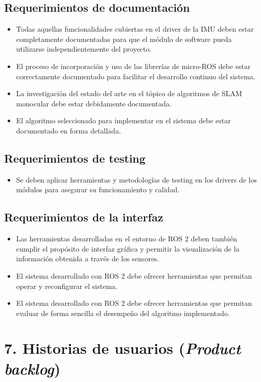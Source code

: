 \documentclass[
11pt, %
codirector, %
]{charter}
\begin{document}
\subsection{Requerimientos de documentación}
\begin{itemize}
	\item Todas aquellas funcionalidades cubiertas en el driver de la IMU deben estar completamente documentadas para que el módulo de software pueda utilizarse independientemente del proyecto.
	\item El proceso de incorporación y uso de las librerías de micro-ROS debe estar correctamente documentado para facilitar el desarrollo continuo del sistema.
	\item La investigación del estado del arte en el tópico de algoritmos de SLAM monocular debe estar debidamente documentada.
	\item El algoritmo seleccionado para implementar en el sistema debe estar documentado en forma detallada.
\end{itemize}

\subsection{Requerimientos de testing}
\begin{itemize}
	\item Se deben aplicar herramientas y metodologías de testing en los drivers de los módulos para asegurar su funcionamiento y calidad.
\end{itemize}

\subsection{Requerimientos de la interfaz}
\begin{itemize}
	\item Las herramientas desarrolladas en el entorno de ROS 2 deben también cumplir el propósito de interfaz gráfica y permitir la visualización de la información obtenida a través de los sensores.
	\item El sistema desarrollado con ROS 2 debe ofrecer herramientas que permitan operar y reconfigurar el sistema.
	\item El sistema desarrollado con ROS 2 debe ofrecer herramientas que permitan evaluar de forma sencilla el desempeño del algoritmo implementado.
\end{itemize}

\section{7. Historias de usuarios (\textit{Product backlog})}
\label{sec:backlog}
\end{document}
